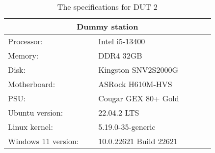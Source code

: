 \begin{table}[H]
    \centering
    \begin{tabular}{|| p{0.38\linewidth} | p{0.49\linewidth} ||}
    \hline
    \multicolumn{2}{||c||}{Dummy station}           \\ [0.5ex] \hline\hline
    Processor:          & Intel i5-13400 \\
    Memory:             & DDR4 32GB    \\
    Disk:               & Kingston SNV2S2000G \\
    Motherboard:        & ASRock H610M-HVS      \\
    PSU:                & Cougar GEX 80+ Gold \\
    Ubuntu version:     & 22.04.2 LTS        \\
    Linux kernel:       & 5.19.0-35-generic       \\
    Windows 11 version: & 10.0.22621 Build 22621 \\ \hline
    \end{tabular}
    \caption{The specifications for DUT 2}
    \label{tab:DUT2}
\end{table}